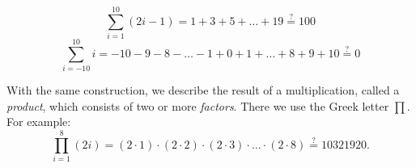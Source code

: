 \begin{example}{}
\[
\sum\limits_{i=1}^{10} (2i-1) = 1+3+5+\ldots+19 \stackrel?= 100
\]
\[
\sum\limits_{i=-10}^{10} i = -10-9-8-\ldots-1+0+1+\dots+8+9+10 \stackrel?=0
\]
\end{example}

With the same construction,
we describe the result of a multiplication, called a \emph{product}, which consists of two or
more \emph{factors}. There we use the Greek letter $\prod$. 
For example:
\[
\prod_{i=1}^8 (2i) = (2\cdot 1)\cdot (2\cdot 2)\cdot (2\cdot 3)\cdot \ldots \cdot (2\cdot 8) 
\stackrel?= 10321920.
\]

